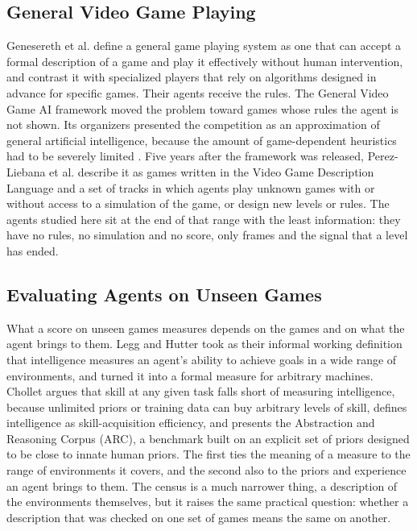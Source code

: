\documentclass[twocolumn]{svjour3}
\begin{document}
\subsection{General Video Game Playing}\label{sec:gvgp}

Genesereth et al. \citep{genesereth2005ggp} define a general game
playing system as one that can accept a formal description of a game and
play it effectively without human intervention, and contrast it with
specialized players that rely on algorithms designed in advance for
specific games. Their agents receive the rules. The General Video Game
AI framework moved the problem toward games whose rules the agent is not
shown. Its organizers presented the competition as an approximation of
general artificial intelligence, because the amount of game-dependent
heuristics had to be severely limited \citep{perezliebana2016gvgp}. Five
years after the framework was released, Perez-Liebana et al.
\citep{perezliebana2019gvgai} describe it as games written in the Video
Game Description Language and a set of tracks in which agents play
unknown games with or without access to a simulation of the game, or
design new levels or rules. The agents studied here sit at the end of
that range with the least information: they have no rules, no simulation
and no score, only frames and the signal that a level has ended.

\subsection{Evaluating Agents on Unseen Games}\label{sec:evaluation}

What a score on unseen games measures depends on the games and on what
the agent brings to them. Legg and Hutter \citep{legg2007universal} took
as their informal working definition that intelligence measures an
agent's ability to achieve goals in a wide range of environments, and
turned it into a formal measure for arbitrary machines. Chollet
\citep{chollet2019measure} argues that skill at any given task falls
short of measuring intelligence, because unlimited priors or training
data can buy arbitrary levels of skill, defines intelligence as
skill-acquisition efficiency, and presents the Abstraction and Reasoning
Corpus (ARC), a benchmark built on an explicit set of priors designed to
be close to innate human priors. The first ties the meaning of a measure
to the range of environments it covers, and the second also to the
priors and experience an agent brings to them. The census is a much
narrower thing, a description of the environments themselves, but it
raises the same practical question: whether a description that was
checked on one set of games means the same on another.
\end{document}

